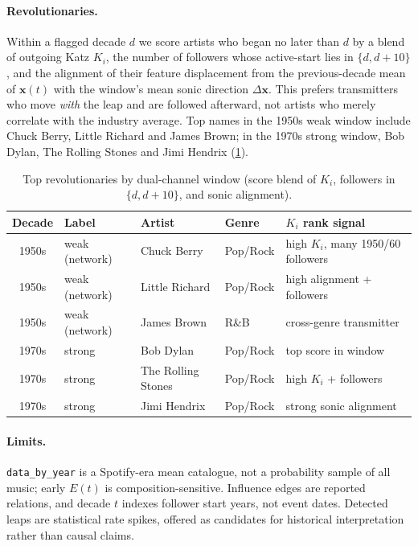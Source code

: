 \paragraph{Revolutionaries.}
Within a flagged decade \(d\) we score artists who began no later than \(d\)
by a blend of outgoing Katz \(K_i\), the number of followers whose
active-start lies in \(\{d,d+10\}\), and the alignment of their feature
displacement from the previous-decade mean of \(\mathbf{x}(t)\) with the
window's mean sonic direction \(\Delta\mathbf{x}\). This prefers transmitters
who move \emph{with} the leap and are followed afterward, not artists who
merely correlate with the industry average. Top names in the 1950s weak
window include Chuck Berry, Little Richard and James Brown; in the 1970s
strong window, Bob Dylan, The Rolling Stones and Jimi Hendrix
(\cref{tab:t5-revs}).

\begin{table}[htbp]
\centering
\caption{Top revolutionaries by dual-channel window (score blend of \(K_i\),
followers in \(\{d,d+10\}\), and sonic alignment).}
\label{tab:t5-revs}
\small
\begin{tabular}{cllll}
\toprule
Decade & Label & Artist & Genre & \(K_i\) rank signal \\
\midrule
1950s & weak (network) & Chuck Berry & Pop/Rock & high \(K_i\), many 1950/60 followers \\
1950s & weak (network) & Little Richard & Pop/Rock & high alignment + followers \\
1950s & weak (network) & James Brown & R\&B & cross-genre transmitter \\
1970s & strong & Bob Dylan & Pop/Rock & top score in window \\
1970s & strong & The Rolling Stones & Pop/Rock & high \(K_i\) + followers \\
1970s & strong & Jimi Hendrix & Pop/Rock & strong sonic alignment \\
\bottomrule
\end{tabular}
\end{table}

\paragraph{Limits.}
\texttt{data\_by\_year} is a Spotify-era mean catalogue, not a probability
sample of all music; early \(E(t)\) is composition-sensitive. Influence edges
are reported relations, and decade \(t\) indexes follower start years, not
event dates. Detected leaps are statistical rate spikes, offered as
candidates for historical interpretation rather than causal claims.

